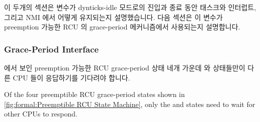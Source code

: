\iffalse

\begin{fcvref}[ln:formal:dyntickrcu:rcu_irq_exit]
\Clnref{fetch} fetches the current CPU's number, as before.
\Clnref{chk_flg} checks to see if the \co{rcu_update_flag} is
non-zero, returning immediately (via falling off the end of the
function) if not.
Otherwise, \clnrefthro{dec_flg}{vrf_even:e} come into play.
\Clnref{dec_flg} decrements \co{rcu_update_flag}, returning
if the result is not zero.
\Clnref{verify} verifies that we are indeed leaving the outermost
level of nested interrupts, \clnref{mb} executes a memory barrier,
\clnref{inc_cnt} increments \co{dynticks_progress_counter},
and \clnref{vrf_even:b,vrf_even:e} verify that this
variable is now even.
As with \co{rcu_enter_nohz()}, the memory barrier ensures that
any other CPU that sees the increment of
\co{dynticks_progress_counter}
will also see the effects of an RCU read-side critical section
in the interrupt handler (preceding the \co{rcu_irq_exit()}
invocation).
\end{fcvref}

\fi

이 두개의 섹션은  변수가 dynticks-idle 모드로의
진입과 종료 동안 태스크와 인터럽트, 그리고 NMI 에서 어떻게 유지되는지
설명했습니다.
다음 섹션은 이 변수가 preemption 가능한 RCU 의 grace-period 메커니즘에서
사용되는지 설명합니다.

\iffalse

These two sections have described how the
\co{dynticks_progress_counter} variable is maintained during
entry to and exit from dynticks-idle mode, both by tasks and by
interrupts and NMIs.
The following section describes how this variable is used by
preemptible RCU's grace-period machinery.

\fi

\subsubsection{Grace-Period Interface}
\label{sec:formal:Grace-Period Interface}

 에서 보인 preemption 가능한 RCU
grace-period 상태 네개 가운데  와
 상태들만이 다른 CPU 들이 응답하기를 기다려야
합니다.

\iffalse

Of the four preemptible RCU grace-period states shown in
\cref{fig:formal:Preemptible RCU State Machine},
only the 
and  states need to wait
for other CPUs to respond.

